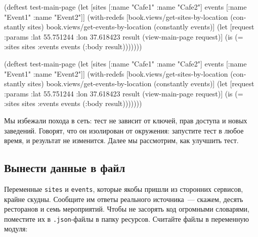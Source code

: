 \ifnarrow

\begin{english}
  \begin{clojure}
(deftest test-main-page
  (let [sites [{:name "Cafe1"}
               {:name "Cafe2"}]
        events [{:name "Event1"}
                {:name "Event2"}]]
    (with-redefs
      [book.views/get-sites-by-location
       (constantly sites)
       book.views/get-events-by-location
       (constantly events)]
      (let [request
            {:params {:lat 55.751244
                      :lon 37.618423}}
            result
            (view-main-page request)]
        (is (= {:sites sites
               :events events}
               (:body result)))))))
  \end{clojure}
\end{english}

\else

\begin{english}
  \begin{clojure}
(deftest test-main-page
  (let [sites [{:name "Cafe1"} {:name "Cafe2"}]
        events [{:name "Event1"} {:name "Event2"}]]
    (with-redefs
      [book.views/get-sites-by-location
         (constantly sites)
       book.views/get-events-by-location
         (constantly events)]
      (let [request {:params {:lat 55.751244
                              :lon 37.618423}}
            result (view-main-page request)]
        (is (= {:sites sites :events events}
               (:body result)))))))
  \end{clojure}
\end{english}

\fi

Мы избежали похода в сеть: тест не зависит от ключей, прав доступа и новых
заведений. Говорят, что он изолирован от окружения: запустите тест в любое
время, и результат не изменится. Далее мы рассмотрим, как улучшить тест.

\subsection{Вынести данные в файл}

Переменные \verb|sites| и \verb|events|, которые якобы пришли из сторонних
сервисов, крайне скудны. Сообщите им ответы реального источника~--- скажем,
десять ресторанов и семь мероприятий. Чтобы не засорять код огромными словарями,
поместите их в \verb|.json|-файлы в папку ресурсов. Считайте файлы в переменную
модуля:


